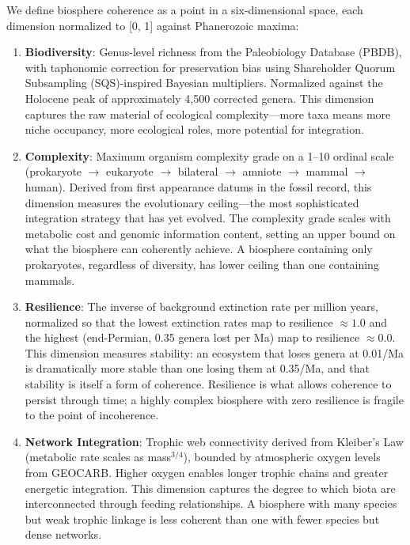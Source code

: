 We define biosphere coherence as a point in a six-dimensional space, each dimension normalized to [0, 1] against Phanerozoic maxima:

\begin{enumerate}

\item \textbf{Biodiversity}: Genus-level richness from the Paleobiology Database (PBDB), with taphonomic correction for preservation bias using Shareholder Quorum Subsampling (SQS)-inspired Bayesian multipliers. Normalized against the Holocene peak of approximately 4,500 corrected genera. This dimension captures the raw material of ecological complexity---more taxa means more niche occupancy, more ecological roles, more potential for integration.

\item \textbf{Complexity}: Maximum organism complexity grade on a 1--10 ordinal scale (prokaryote $\to$ eukaryote $\to$ bilateral $\to$ amniote $\to$ mammal $\to$ human). Derived from first appearance datums in the fossil record, this dimension measures the evolutionary ceiling---the most sophisticated integration strategy that has yet evolved. The complexity grade scales with metabolic cost and genomic information content, setting an upper bound on what the biosphere can coherently achieve. A biosphere containing only prokaryotes, regardless of diversity, has lower ceiling than one containing mammals.

\item \textbf{Resilience}: The inverse of background extinction rate per million years, normalized so that the lowest extinction rates map to resilience $\approx 1.0$ and the highest (end-Permian, 0.35 genera lost per Ma) map to resilience $\approx 0.0$. This dimension measures stability: an ecosystem that loses genera at 0.01/Ma is dramatically more stable than one losing them at 0.35/Ma, and that stability is itself a form of coherence. Resilience is what allows coherence to persist through time; a highly complex biosphere with zero resilience is fragile to the point of incoherence.

\item \textbf{Network Integration}: Trophic web connectivity derived from Kleiber's Law (metabolic rate scales as mass$^{3/4}$), bounded by atmospheric oxygen levels from GEOCARB. Higher oxygen enables longer trophic chains and greater energetic integration. This dimension captures the degree to which biota are interconnected through feeding relationships. A biosphere with many species but weak trophic linkage is less coherent than one with fewer species but dense networks.


\end{enumerate}
